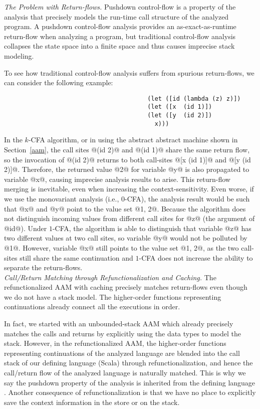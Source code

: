 \documentclass[acmsmall, screen]{acmart}\settopmatter{}
\begin{document}
\textit{The Problem with Return-flows.}
Pushdown control-flow is a property of the analysis that precisely models the run-time
call structure of the analyzed program. A pushdown control-flow analysis provides an
as-exact-as-runtime return-flow when analyzing a program, but traditional
control-flow analysis collapses the state space into a finite space and
thus causes imprecise stack modeling.

To see how traditional control-flow analysis suffers from spurious return-flows,
we can consider the following example:

\begin{lstlisting}
                                        (let ([id (lambda (z) z)])
                                        (let ([x  (id 1)])
                                        (let ([y  (id 2)])
                                          x)))
\end{lstlisting}

In the $k$-CFA algorithm, or in using the abstract abstract machine shown in Section~\ref{aam},
the call sites @(id 2)@ and @(id 1)@ share the same return flow, so the invocation
of @(id 2)@ returns to both call-sites @[x (id 1)]@ and @[y (id 2)]@.  Therefore,
the returned value @2@ for variable @y@ is also propagated to variable @x@, causing
imprecise analysis results to arise. This return-flow merging is inevitable, even when
increasing the context-sensitivity. Even worse, if we use the monovariant analysis (i.e.,
$0$-CFA), the analysis result would be such that @x@ and @y@ point to the value set @{1, 2}@.
Because the algorithm does not distinguish incoming values from different call sites
for @z@ (the argument of @id@). Under $1$-CFA, the algorithm is able to distinguish that variable
@z@ has two different values at two call sites, so variable @y@ would not be polluted by
@1@. However, variable @x@ still points to the value set @{1, 2}@, as the two call-sites
still share the same continuation and $1$-CFA does not increase the ability to separate the
return-flows. \\

\textit{Call/Return Matching through Refunctionalization and Caching.}
The refunctionalized AAM with caching precisely matches return-flows even though
we do not have a stack model. The higher-order functions representing continuations
already connect all the executions in order.

In fact, we started with an unbounded-stack AAM which already precisely matches the calls and returns
by explicitly using the data types to model the stack.
However, in the refunctionalized AAM, the higher-order functions representing continuations of the analyzed 
language are blended into the call stack of our defining language (Scala) through 
refunctionalization, and hence the call/return flow of the analyzed language is naturally matched.
This is why we say the pushdown property of the analysis is inherited from the defining language \cite{darais2017abstracting}.
Another consequence of refunctionalization is that we have no place to explicitly save the context
information in the store or on the stack.
\end{document}
